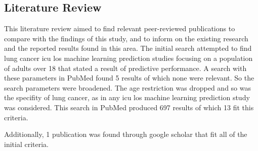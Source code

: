 \documentclass[11pt]{article}
\begin{document}
\subsection{Literature Review}

This literature review aimed to find relevant peer-reviewed publications to compare with the findings of this study, and to inform on the existing research and the reported results found in this area. The initial search attempted to find lung cancer \gls{icu} \gls{los} machine learning prediction studies focusing on a population of adults over 18 that stated a result of predictive performance. A search with these parameters in PubMed found 5 results of which none were relevant. So the search parameters were broadened. The age restriction was dropped and so was the specifity of lung cancer, as in any \gls{icu} \gls{los} machine learning prediction study was considered. This search in PubMed produced 697 results of which 13 fit this criteria.

Additionally, 1 publication was found through google scholar that fit all of the initial criteria. 
\end{document}
